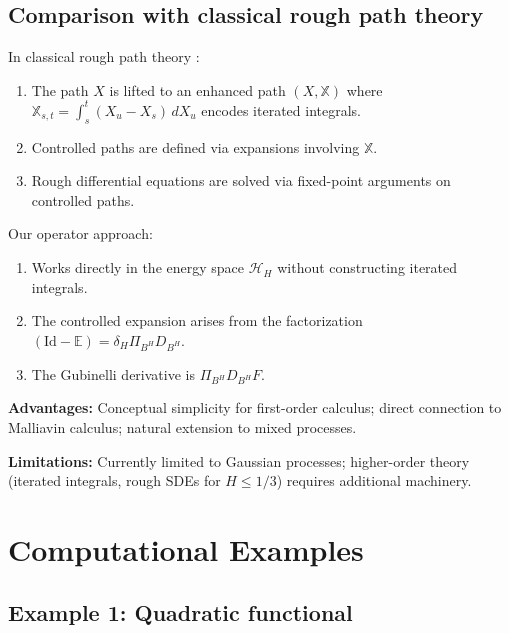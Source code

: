 \documentclass[11pt,a4paper]{article}
\theoremstyle{plain}
\theoremstyle{definition}
\theoremstyle{remark}
\newcommand{\E}{\mathbb{E}}
\newcommand{\Id}{\mathrm{Id}}
\newcommand{\HH}{\mathcal{H}_H}
\begin{document}
\subsection{Comparison with classical rough path theory}

In classical rough path theory \cite{FH14}:
\begin{enumerate}
\item The path $X$ is lifted to an enhanced path $(X, \mathbb{X})$ where $\mathbb{X}_{s,t} = \int_s^t (X_u - X_s) \, dX_u$ encodes iterated integrals.
\item Controlled paths are defined via expansions involving $\mathbb{X}$.
\item Rough differential equations are solved via fixed-point arguments on controlled paths.
\end{enumerate}

Our operator approach:
\begin{enumerate}
\item Works directly in the energy space $\HH$ without constructing iterated integrals.
\item The controlled expansion arises from the factorization $(\Id - \E) = \delta_H \Pi_{B^H} D_{B^H}$.
\item The Gubinelli derivative is $\Pi_{B^H} D_{B^H} F$.
\end{enumerate}

\textbf{Advantages:} Conceptual simplicity for first-order calculus; direct connection to Malliavin calculus; natural extension to mixed processes.

\textbf{Limitations:} Currently limited to Gaussian processes; higher-order theory (iterated integrals, rough SDEs for $H \leq 1/3$) requires additional machinery.

\section{Computational Examples}\label{sec:examples}

\subsection{Example 1: Quadratic functional}
\end{document}
